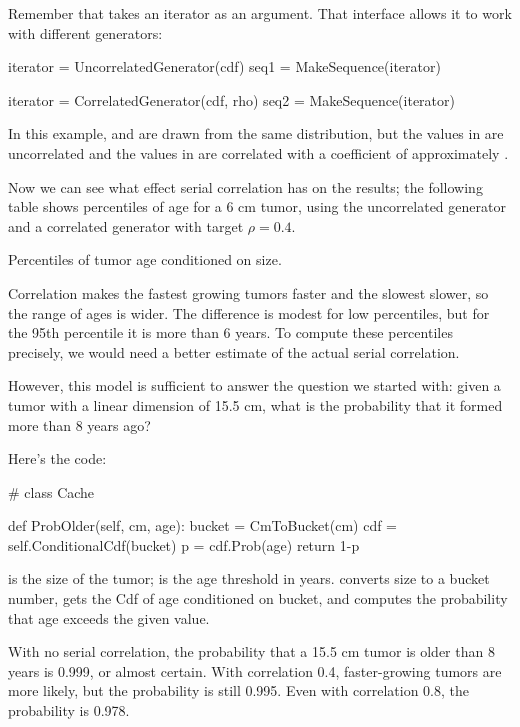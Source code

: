 \documentclass[12pt]{book}
\theoremstyle{exercise}
\begin{document}
Remember that  takes an iterator as an argument.
That interface allows it to work with different generators:

\begin{code}
    iterator = UncorrelatedGenerator(cdf)
    seq1 = MakeSequence(iterator)

    iterator = CorrelatedGenerator(cdf, rho)
    seq2 = MakeSequence(iterator)
\end{code}

In this example,  and  are
drawn from the same distribution, but the values in 
are uncorrelated and the values in  are correlated
with a coefficient of approximately .

Now we can see what effect serial correlation has on the results;
the following table shows percentiles of age for a 6 cm tumor,
using the uncorrelated generator and a correlated generator
with target $\rho = 0.4$.

\begin{table}

\caption{Percentiles of tumor age conditioned on size.}
\end{table}

Correlation makes the fastest growing tumors faster and the slowest
slower, so the range of ages is wider.  The difference is modest for
low percentiles, but for the 95th percentile it is more than 6 years.
To compute these percentiles precisely, we would need a better
estimate of the actual serial correlation.

However, this model is sufficient to answer the question
we started with: given a tumor with a linear dimension of
15.5 cm, what is the probability that it formed more than
8 years ago?

Here's the code:

\begin{code}
# class Cache

    def ProbOlder(self, cm, age):
        bucket = CmToBucket(cm)
        cdf = self.ConditionalCdf(bucket)
        p = cdf.Prob(age)
        return 1-p
\end{code}

 is the size of the tumor;  is the age threshold
in years.   converts size to a bucket number,
gets the Cdf of age conditioned on bucket, and computes the
probability that age exceeds the given value.

With no serial correlation, the probability that a
15.5 cm tumor is older than 8 years is 0.999, or almost certain.
With correlation 0.4, faster-growing tumors are more likely, but
the probability is still 0.995.  Even with correlation 0.8, the
probability is 0.978.
\end{document}
